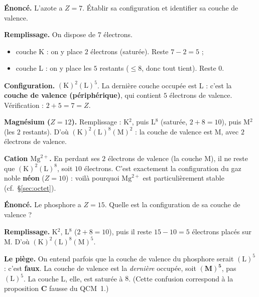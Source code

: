 \documentclass[11pt,a4paper]{article}
\begin{document}
\begin{exemple}
\textbf{Énoncé.} L'azote a $Z = 7$. Établir sa configuration et identifier sa couche de valence.

\smallskip
\textbf{Remplissage.} On dispose de $7$ électrons.
\begin{itemize}[leftmargin=1.6em,topsep=2pt,itemsep=1pt]
  \item couche K : on y place $2$ électrons (saturée). Reste $7 - 2 = 5$ ;
  \item couche L : on y place les $5$ restants ($\le 8$, donc tout tient). Reste $0$.
\end{itemize}
\textbf{Configuration.} $(\mathrm{K})^2(\mathrm{L})^5$. La dernière couche occupée est L : c'est la
\textbf{couche de valence (périphérique)}, qui contient $5$ électrons de valence. Vérification :
$2 + 5 = 7 = Z$. \checkmark
\end{exemple}

\begin{exemple}
\textbf{Magnésium ($Z = 12$).} Remplissage : K$^2$, puis L$^8$ (saturée, $2+8 = 10$), puis M$^2$
(les $2$ restants). D'où $(\mathrm{K})^2(\mathrm{L})^8(\mathrm{M})^2$ : la couche de valence est M, avec
$2$ électrons de valence.

\smallskip
\textbf{Cation $\mathrm{Mg}^{2+}$.} En perdant ses $2$ électrons de valence (la couche M), il ne reste
que $(\mathrm{K})^2(\mathrm{L})^8$, soit $10$ électrons. C'est exactement la configuration du gaz noble
\textbf{néon} ($Z = 10$) : voilà pourquoi $\mathrm{Mg}^{2+}$ est particulièrement stable (cf.\ §\ref{sec:octet}).
\end{exemple}

\begin{exemple}
\textbf{Énoncé.} Le phosphore a $Z = 15$. Quelle est la configuration de sa couche de valence ?

\smallskip
\textbf{Remplissage.} K$^2$, L$^8$ ($2+8 = 10$), puis il reste $15 - 10 = 5$ électrons placés sur M.
D'où $(\mathrm{K})^2(\mathrm{L})^8(\mathrm{M})^5$.

\smallskip
\textbf{Le piège.} On entend parfois que la couche de valence du phosphore serait $(\mathrm{L})^5$ :
c'est \textbf{faux}. La couche de valence est la \emph{dernière} occupée, soit $\mathbf{(M)^5}$, pas
$(\mathrm{L})^5$. La couche L, elle, est saturée à $8$. (Cette confusion correspond à la proposition
\textbf{C} fausse du QCM~1.)
\end{exemple}
\end{document}
